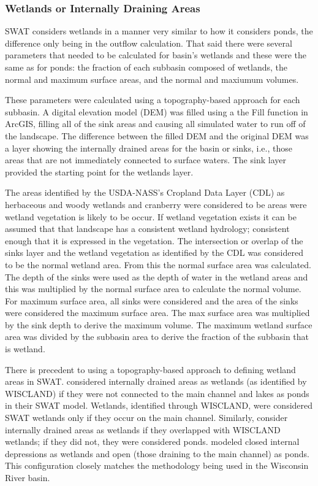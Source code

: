 \subsubsection{Wetlands or Internally Draining Areas}

	SWAT considers wetlands in a manner very similar to how it considers ponds, the difference only being in the outflow calculation. That said there were several parameters that needed to be calculated for basin's wetlands and these were the same as for ponds: the fraction of each subbasin composed of wetlands, the normal and maximum surface areas, and the normal and maxiumum volumes. 
	
	These parameters were calculated using a topography-based approach for each subbasin. A digital elevation model (DEM) was filled using a the Fill function in ArcGIS, filling all of the sink areas and causing all simulated water to run off of the landscape. The difference between the filled DEM and the original DEM was a layer showing the internally drained areas for the basin or sinks, i.e., those areas that are not immediately connected to surface waters. The sink layer provided the starting point for the wetlands layer. 
	
	The areas identified by the USDA-NASS's Cropland Data Layer (CDL) as herbaceous and woody wetlands and cranberry were considered to be areas were wetland vegetation is likely to be occur. If wetland vegetation exists it can be assumed that that landscape has a consistent wetland hydrology; consistent enough that it is expressed in the vegetation. The intersection or overlap of the sinks layer and the wetland vegetation as identified by the CDL was considered to be the normal wetland area. From this the normal surface area was calculated. The depth of the sinks were used as the depth of water in the wetland areas and this was multiplied by the normal surface area to calculate the normal volume. For maximum surface area, all sinks were considered and the area of the sinks were considered the maximum surface area. The max surface area was multiplied by the sink depth to derive the maximum volume. The maximum wetland surface area was divided by the subbasin area to derive the fraction of the subbasin that is wetland.
	
	There is precedent to using a topography-based approach to defining wetland areas in SWAT. \citet{almendinger_willowriverswat_2007} considered internally drained areas as wetlands (as identified by WISCLAND) if they were not connected to the main channel and lakes as ponds in their SWAT model. Wetlands, identified through WISCLAND, were considered SWAT wetlands only if they occur on the main channel. Similarly, \citet{kirsch_rock_2002} consider internally drained areas as wetlands if they overlapped with WISCLAND wetlands; if they did not, they were considered ponds.  \citet{almendinger_swat_2010} modeled closed internal depressions as wetlands and open (those draining to the main channel) as ponds. This configuration closely matches the methodology being used in the Wisconsin River basin.






